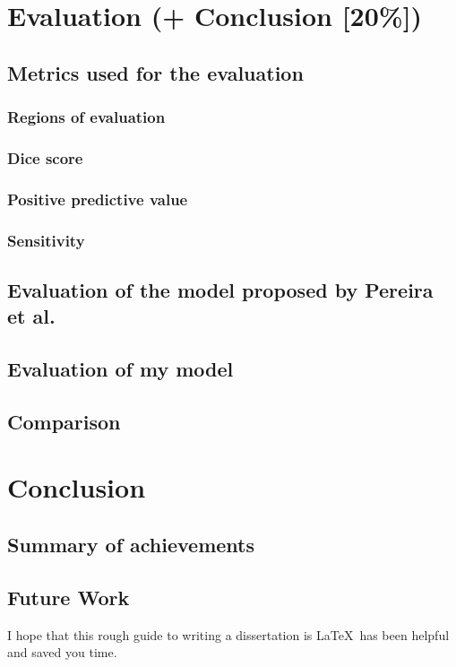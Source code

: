 \documentclass[12pt,a4paper,twoside,openright]{report}
\begin{document}
\chapter{Evaluation (+ Conclusion [20\%])}

\section{Metrics used for the evaluation}
\subsection{Regions of evaluation}
\subsection{Dice score}
\subsection{Positive predictive value}
\subsection{Sensitivity}

\section{Evaluation of the model proposed by Pereira et al.}
\section{Evaluation of my model}
\section{Comparison}

\chapter{Conclusion}
\section{Summary of achievements}
\section{Future Work}

I hope that this rough guide to writing a dissertation is \LaTeX\ has
been helpful and saved you time.
\end{document}

